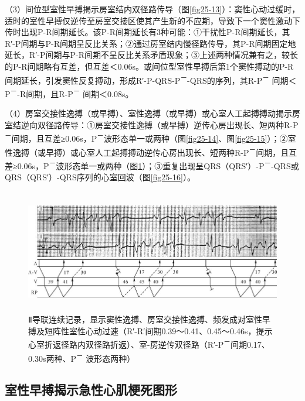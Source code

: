 （3）间位型室性早搏揭示房室结内双径路传导（图\ref{fig25-13}）：窦性心动过缓时，适时的室性早搏仅逆传至房室交接区使其产生新的不应期，导致下一个窦性激动下传时出现P-R间期延长。该P-R间期延长有3种可能：①干扰性P-R间期延长，其R′-P间期与P-R间期呈反比关系；②通过房室结内慢径路传导，其P-R间期固定地延长，R′-P间期与P-R间期不呈反比关系矛盾现象；③上述两种情况兼有之，较长的P-R间期略有互差，但互差＜0.06s。或间位型室性早搏后第1个窦性搏动的P-R间期延长，引发窦性反复搏动，形成R′-P-QRS-P\textsuperscript{－}-QRS的序列，其R-P\textsuperscript{－} 间期＜P\textsuperscript{－}-R间期，且R-P\textsuperscript{－} 间期＜0.08s。

（4）房室交接性逸搏（或早搏）、室性逸搏（或早搏）或心室人工起搏搏动揭示房室结逆向双径路传导：①房室交接性逸搏（或早搏）逆传心房出现长、短两种R-P\textsuperscript{－}间期，且互差≥0.06s，P\textsuperscript{－}波形态单一或两种（图\ref{fig25-14}、图\ref{fig25-15}）；②室性逸搏（或早搏）或心室人工起搏搏动逆传心房出现长、短两种R-P\textsuperscript{－}间期，且互差≥0.06s，P\textsuperscript{－}波形态单一或两种（图\ref{fig36-6}）；③重复出现呈QRS（QRS′）-P\textsuperscript{－}-QRS或QRS（QRS′）-QRS序列的心室回波（图\ref{fig25-16}）。

\begin{figure}[!htbp]
 \centering
 \includegraphics[width=5.79167in,height=2.13542in]{./images/Image00578.jpg}
 \captionsetup{justification=centering}
 \caption{Ⅱ导联连续记录，显示窦性逸搏、房室交接性逸搏、频发成对室性早搏及短阵性室性心动过速（R′-R′间期0.39～0.41、0.45～0.46s，提示心室折返径路内双径路折返）、室-房逆传双径路（R′-P\textsuperscript{－}间期0.17、0.30s两种、P\textsuperscript{－} 波形态两种）}
 \label{fig36-6}
  \end{figure} 


\protect\hypertarget{text00043.htmlux5cux23subid469}{}{}

\subsection{室性早搏揭示急性心肌梗死图形}

